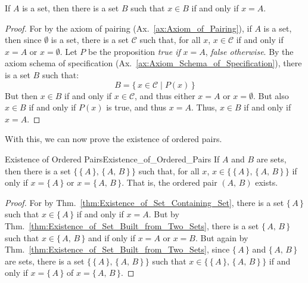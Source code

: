         \begin{theorem}
            \label{thm:Existence_of_Set_Containing_Set}%
            If $A$ is a set, then there is a set $B$ such that $x\in{B}$ if
            and only if $x=A$.
        \end{theorem}
        \begin{proof}
            For by the axiom of pairing (Ax.~\ref{ax:Axiom_of_Pairing}),
            if $A$ is a set, then since $\emptyset$ is a set, there is a set
            $\mathcal{C}$ such that, for all $x$, $x\in\mathcal{C}$ if and
            only if $x=A$ or $x=\emptyset$. Let $P$ be the proposition
            \textit{true if} $x=A$, \textit{false otherwise}. By the axiom
            schema of specification
            (Ax.~\ref{ax:Axiom_Schema_of_Specification}), there is a set $B$
            such that:
            \begin{equation}
                B=\{\,x\in\mathcal{C}\;|\;P(x)\,\}
            \end{equation}
            But then $x\in{B}$ if and only if $x\in\mathcal{C}$, and thus either
            $x=A$ or $x=\emptyset$. But also $x\in{B}$ if and only if $P(x)$ is
            true, and thus $x=A$. Thus, $x\in{B}$ if and only if $x=A$.
        \end{proof}
        With this, we can now prove the existence of ordered pairs.
        \begin{ltheorem}{Existence of Ordered Pairs}{Existence_of_Ordered_Pairs}
            If $A$ and $B$ are sets, then there is a set
            $\{\,\{\,A\,\},\,\{\,A,\,B\,\}\,\}$ such that, for all $x$,
            $x\in\{\,\{\,A\,\},\,\{\,A,\,B\,\}\,\}$ if only if $x=\{\,A\,\}$
            or $x=\{\,A,\,B\,\}$. That is, the ordered pair $(A,\,B)$ exists.
        \end{ltheorem}
        \begin{proof}
            For by Thm.~\ref{thm:Existence_of_Set_Containing_Set}, there is
            a set $\{\,A\,\}$ such that $x\in\{\,A\,\}$ if and only if $x=A$.
            But by Thm.~\ref{thm:Existence_of_Set_Built_from_Two_Sets}, there
            is a set $\{\,A,\,B\,\}$ such that $x\in\{\,A,\,B\,\}$ and if only
            if $x=A$ or $x=B$. But again by
            Thm.~\ref{thm:Existence_of_Set_Built_from_Two_Sets}, since
            $\{\,A\,\}$ and $\{\,A,\,B\,\}$ are sets, there is a set
            $\{\,\{\,A\,\},\,\{\,A,\,B\,\}\,\}$ such that
            $x\in\{\,\{\,A\,\},\,\{\,A,\,B\,\}\,\}$ if and only if
            $x=\{\,A\,\}$ of $x=\{\,A,\,B\,\}$.
        \end{proof}
